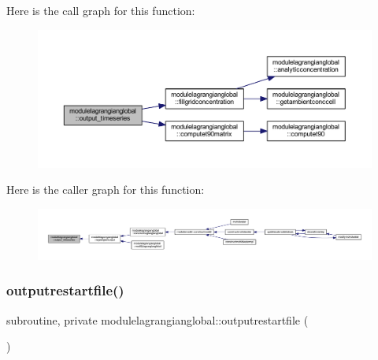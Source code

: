 Here is the call graph for this function\+:\nopagebreak
\begin{figure}[H]
\begin{center}
\leavevmode
\includegraphics[width=350pt]{namespacemodulelagrangianglobal_a9965ea6d7045ff51397b7c8dcddf580c_cgraph}
\end{center}
\end{figure}
Here is the caller graph for this function\+:\nopagebreak
\begin{figure}[H]
\begin{center}
\leavevmode
\includegraphics[width=350pt]{namespacemodulelagrangianglobal_a9965ea6d7045ff51397b7c8dcddf580c_icgraph}
\end{center}
\end{figure}
\mbox{\label{namespacemodulelagrangianglobal_a9eaa20c6b0f8ebb9961c4eb75eaffb59}} 
\subsubsection{\texorpdfstring{outputrestartfile()}{outputrestartfile()}}
{\footnotesize\ttfamily subroutine, private modulelagrangianglobal\+::outputrestartfile (\begin{DoxyParamCaption}{ }\end{DoxyParamCaption})\hspace{0.3cm}{\ttfamily [private]}}

